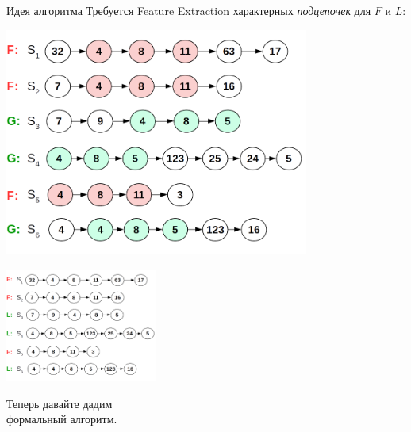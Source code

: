 \begin{frame}{Идея алгоритма}
	\small
	Требуется Feature Extraction характерных \textit{подцепочек} для $F$ и $L$:
	\begin{center}
		\includegraphics[width=10cm]{../pic/beh/idea_3.png}\centering
	\end{center}
\end{frame}

\begin{frame}
	\Large
	\centering
\end{frame}


\begin{frame}[t]
	\includegraphics[width=5cm]{../pic/beh/idea_2.png}
\end{frame}

\begin{frame}
	\Large
	\centering
	Теперь давайте дадим \\ формальный алгоритм.
\end{frame}

